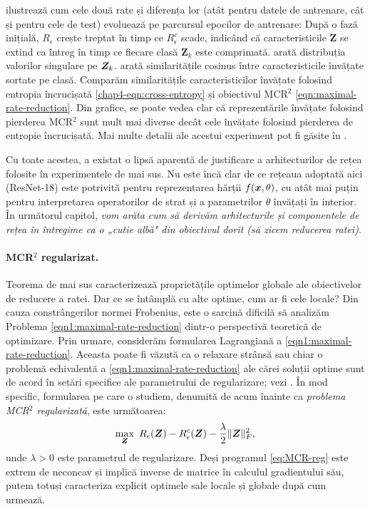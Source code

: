 \documentclass[../../book-main_ro.tex]{subfiles}
\begin{document}
\begin{example}
	 ilustrează cum cele două rate și diferența lor (atât pentru datele de antrenare, cât și pentru cele de test) evoluează pe parcursul epocilor de antrenare: După o fază inițială, $R_\epsilon$ crește treptat în timp ce $R^c_\epsilon$ scade, indicând că caracteristicile $\bm Z$ se extind ca întreg în timp ce fiecare clasă $\bm Z_k$ este comprimată.
	 arată distribuția valorilor singulare pe $\bm{Z}_k$.  arată similaritățile cosinus între caracteristicile învățate sortate pe clasă. Comparăm similaritățile caracteristicilor învățate folosind entropia încrucișată \eqref{chap4-eqn:cross-entropy} și obiectivul MCR$^2$ \eqref{eqn:maximal-rate-reduction}. Din grafice, se poate vedea clar că reprezentările învățate folosind pierderea MCR$^2$ sunt mult mai diverse decât cele învățate folosind pierderea de entropie încrucișată. Mai multe detalii ale acestui experiment pot fi găsite în \cite{chan2021redunet}.
	\label{eg:Rate-Reduction-CIFAR10}
\end{example}

Cu toate acestea, a existat o lipsă aparentă de justificare a arhitecturilor de rețea folosite în experimentele de mai sus. Nu este încă clar de ce rețeaua adoptată aici (ResNet-18) este potrivită pentru reprezentarea hărții $f(\bm{x}, \theta)$, cu atât mai puțin pentru interpretarea operatorilor de strat și a parametrilor $\theta$ învățați în interior. În următorul capitol, {\em vom arăta cum să derivăm arhitecturile și componentele de rețea în întregime ca o „cutie albă" din obiectivul dorit (să zicem reducerea ratei)}.

\paragraph{MCR$^2$ regularizat.}
Teorema de mai sus caracterizează proprietățile optimelor globale ale obiectivelor de reducere a ratei. Dar ce se întâmplă cu alte optime, cum ar fi cele locale? Din cauza constrângerilor normei Frobenius, este o sarcină dificilă să analizăm Problema \eqref{eqn1:maximal-rate-reduction} dintr-o perspectivă teoretică de optimizare. Prin urmare, considerăm formularea Lagrangiană a \eqref{eqn1:maximal-rate-reduction}. Aceasta poate fi văzută ca o relaxare strânsă sau chiar o problemă echivalentă a \eqref{eqn1:maximal-rate-reduction} ale cărei soluții optime sunt de acord în setări specifice ale parametrului de regularizare; vezi \cite[Propozițiunea 1]{wang2024global}.
În mod specific, formularea pe care o studiem, denumită de acum înainte ca {\textit{problema MCR$^2$ regularizată}}, este următoarea:
\begin{align}\label{eq:MCR-reg}
	\max_{\bm Z}\ R_{\epsilon}(\bm{Z}) - R_{\epsilon}^c(\bm{Z}) - \frac{\lambda}{2}\|\bm Z\|_F^2,
\end{align}
unde $\lambda > 0$ este parametrul de regularizare. Deși programul \eqref{eq:MCR-reg} este extrem de neconcav și implică inverse de matrice în calculul gradientului său, putem totuși caracteriza explicit optimele sale locale și globale după cum urmează.
\end{document}
